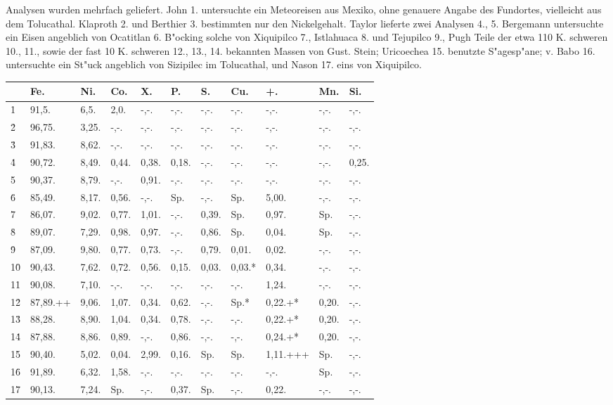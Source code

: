 \documentclass[a4paper, 11pt, oneside]{article}
\begin{document}
Analysen wurden mehrfach geliefert. John 1. untersuchte ein Meteoreisen aus Mexiko, ohne genauere Angabe des Fundortes, vielleicht aus dem Tolucathal. Klaproth 2. und Berthier 3. bestimmten nur den Nickelgehalt. Taylor lieferte zwei Analysen 4., 5. Bergemann untersuchte ein Eisen angeblich von Ocatitlan 6. B"ocking solche von Xiquipilco 7., Istlahuaca 8. und Tejupilco 9., Pugh Teile der etwa 110 K. schweren 10., 11., sowie der fast 10 K. schweren 12., 13., 14. bekannten Massen von Gust. Stein; Uricoechea 15. benutzte S"agesp"ane; v. Babo 16. untersuchte ein St"uck angeblich von Sizipilec im Tolucathal, und Nason 17. eins von Xiquipilco.
\begin{table}[H]
    \centering\swabfamily\Large
    \normalsize
    \begin{tabular}{l l l l l l l l l l l}
         & Fe. & Ni. & Co. & X. & P. & S. & Cu. & +. & Mn. & Si. \\ \hline
        1\. & 91,5. & 6,5. & 2,0. & -,-. & -,-. & -,-. & -,-. & -,-. & -,-. & -,-. \\
        2\. & 96,75. & 3,25. & -,-. & -,-. & -,-. & -,-. & -,-. & -,-. & -,-. & -,-. \\
        3\. & 91,83. & 8,62. & -,-. & -,-. & -,-. & -,-. & -,-. & -,-. & -,-. & -,-. \\
        4\. & 90,72. & 8,49. & 0,44. & 0,38. & 0,18. & -,-. & -,-. & -,-. & -,-. & 0,25. \\
        5\. & 90,37. & 8,79. & -,-. & 0,91. & -,-. & -,-. & -,-. & -,-. & -,-. & -,-. \\
        6\. & 85,49. & 8,17. & 0,56. & -,-. & Sp. & -,-. & Sp. & 5,00. & -,-. & -,-. \\
        7\. & 86,07. & 9,02. & 0,77. & 1,01. & -,-. & 0,39. & Sp. & 0,97. & Sp. & -,-. \\
        8\. & 89,07. & 7,29. & 0,98. & 0,97. & -,-. & 0,86. & Sp. & 0,04. & Sp. & -,-. \\
        9\. & 87,09. & 9,80. & 0,77. & 0,73. & -,-. & 0,79. & 0,01. & 0,02. & -,-. & -,-. \\
        10\. & 90,43. & 7,62. & 0,72. & 0,56. & 0,15. & 0,03. & 0,03.* & 0,34. & -,-. & -,-. \\
        11\. & 90,08. & 7,10. & -,-. & -,-. & -,-. & -,-. & -,-. & 1,24. & -,-. & -,-. \\
        12\. & 87,89.++ & 9,06. & 1,07. & 0,34. & 0,62. & -,-. & Sp.* & 0,22.+* & 0,20. & -,-. \\
        13\. & 88,28. & 8,90. & 1,04. & 0,34. & 0,78. & -,-. & -,-. & 0,22.+* & 0,20. & -,-. \\
        14\. & 87,88. & 8,86. & 0,89. & -,-. & 0,86. & -,-. & -,-. & 0,24.+* & 0,20. & -,-. \\
        15\. & 90,40. & 5,02. & 0,04. & 2,99. & 0,16. & Sp. & Sp. & 1,11.+++ & Sp. & -,-. \\
        16\. & 91,89. & 6,32. & 1,58. & -,-. & -,-. & -,-. & -,-. & -,-. & Sp. & -,-. \\
        17\. & 90,13. & 7,24. & Sp. & -,-. & 0,37. & Sp. & -,-. & 0,22. & -,-. & -,-. \\
    \end{tabular}
\end{table}
\end{document}
